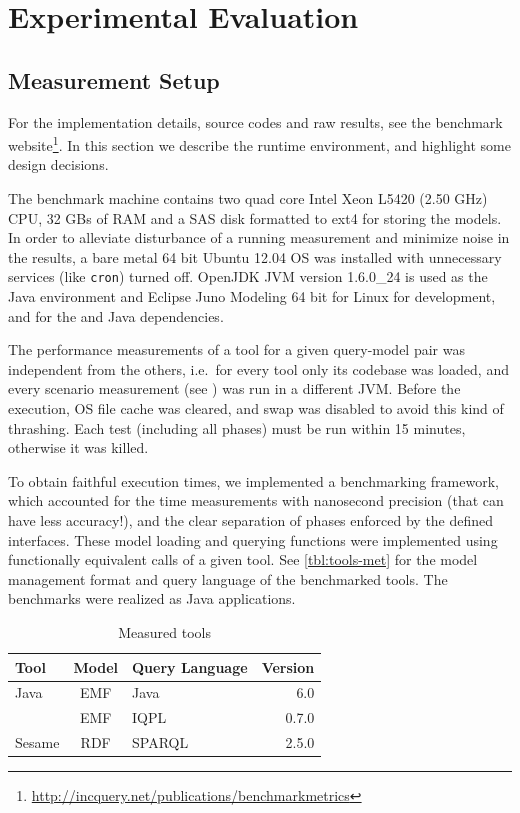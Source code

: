 \section{Experimental Evaluation}
\label{sec:eval}
% 

\subsection{Measurement Setup}

For the implementation details, source codes and raw results, see the
benchmark website\footnote{\url{http://incquery.net/publications/benchmarkmetrics}}. In this
section we describe the runtime environment, and highlight some design
decisions.

The benchmark machine contains two quad core Intel Xeon L5420 (2.50 GHz) CPU, 32 GBs of RAM and a SAS disk formatted to ext4 for storing the models. In order to alleviate disturbance of a running measurement and minimize noise in the results,
a bare metal 64 bit Ubuntu 12.04 OS was installed with unnecessary services
(like \texttt{cron}) turned off. OpenJDK JVM version 1.6.0\_24 is used as the Java
environment and Eclipse Juno Modeling 64 bit for Linux for development, and for
the \incquery{} and Java dependencies.

The performance measurements of a tool for a given query-model pair
was independent from the others, i.e.\ for every tool only its codebase was
loaded, and every scenario measurement (see ) was run
in a different JVM. Before the execution, OS file cache was cleared, and swap
was disabled to avoid this kind of thrashing. Each test (including all phases)
must be run within 15 minutes, otherwise it was killed.

To obtain faithful execution times, we implemented a benchmarking framework,
which accounted for the time measurements with nanosecond precision (that can have
less accuracy!), and the clear separation of phases enforced by the defined
interfaces. These model loading and querying functions were implemented using
functionally equivalent calls of a given tool. See \autoref{tbl:tools-met} for
the model management format and query language of the benchmarked tools. The
benchmarks were realized as Java applications.

\begin{table}[h]
	\centering
	\footnotesize
	\begin{tabular}{ | l | c | l | r | }
	\hline 
	\textbf{Tool} & \textbf{Model} & \textbf{Query Language} & \textbf{Version} \\ \hline
	Java & EMF & Java & 6.0 \\ \hline
	\incquery{} & EMF & IQPL & 0.7.0 \\ \hline
	Sesame & RDF & SPARQL & 2.5.0 \\ \hline
	\end{tabular}
	\caption{Measured tools}
	\label{tbl:tools-met}
\end{table}


